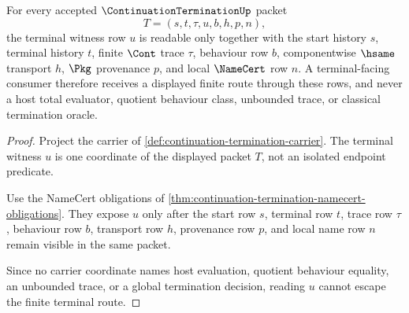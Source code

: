 \begin{theorem}
\label{thm:continuation-termination-terminal-route}
For every accepted $\ContinuationTerminationUp$ packet
$$
T=(s,t,\tau,u,b,h,p,n),
$$
the terminal witness row $u$ is readable only together with the start history $s$, terminal history $t$, finite $\Cont$ trace $\tau$, behaviour row $b$, componentwise $\hsame$ transport $h$, $\Pkg$ provenance $p$, and local $\NameCert$ row $n$. A terminal-facing consumer therefore receives a displayed finite route through these rows, and never a host total evaluator, quotient behaviour class, unbounded trace, or classical termination oracle.
\end{theorem}
\begin{proof}
Project the carrier of \autoref{def:continuation-termination-carrier}. The terminal witness $u$ is one coordinate of the displayed packet $T$, not an isolated endpoint predicate.

Use the NameCert obligations of \autoref{thm:continuation-termination-namecert-obligations}. They expose $u$ only after the start row $s$, terminal row $t$, trace row $\tau$, behaviour row $b$, transport row $h$, provenance row $p$, and local name row $n$ remain visible in the same packet.

Since no carrier coordinate names host evaluation, quotient behaviour equality, an unbounded trace, or a global termination decision, reading $u$ cannot escape the finite terminal route.
\end{proof}

